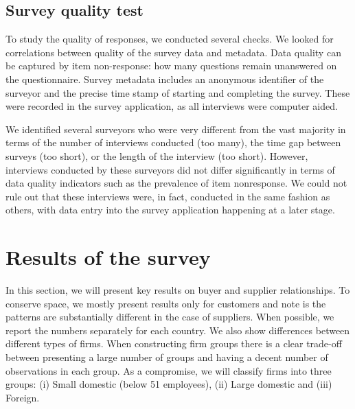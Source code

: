 \documentclass[final, dvipsnames, authoryear,12pt]{elsarticle}
\begin{document}
\subsection{Survey quality test}
\label{sec:quality_test}



To study the quality of responses, we conducted several checks. We looked for correlations between quality of the survey data and metadata. Data quality can be captured by item non-response: how many questions remain unanswered on the questionnaire. Survey metadata includes an anonymous identifier of the surveyor and the precise time stamp of starting and completing the survey. These were recorded in the survey application, as all interviews were computer aided. 

We identified several surveyors who were very different from the vast majority in terms of the number of interviews conducted (too many), the time gap between surveys (too short), or the length of the interview (too short). However, interviews conducted by these surveyors did not differ significantly in terms of data quality indicators such as the prevalence of item nonresponse. We could not rule out that these interviews were, in fact, conducted in the same fashion as others, with data entry into the survey application happening at a later stage.


\section{Results of the survey}
\label{sec:desc}

In this section, we will present key results on buyer and supplier relationships. To conserve space, we mostly present results only for customers and note is the patterns are substantially different in the case of suppliers. When possible, we report the numbers separately for each country. We also show differences between different types of firms. When constructing firm groups there is a clear trade-off between presenting a large number of groups and having a decent number of observations in each group. As a compromise, we will classify firms into three groups: (i) Small domestic (below 51 employees), (ii) Large domestic and (iii) Foreign. 
\end{document}

